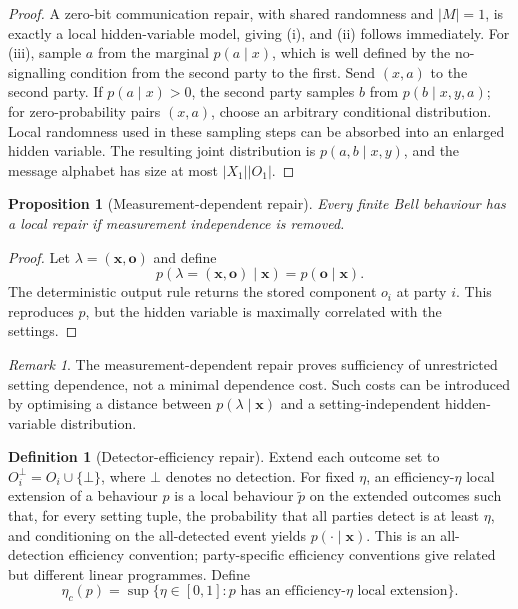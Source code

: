 \documentclass[11pt]{article}
\theoremstyle{plain}
\newtheorem{proposition}[theorem]{Proposition}
\theoremstyle{definition}
\newtheorem{definition}[theorem]{Definition}
\theoremstyle{remark}
\newtheorem{remark}[theorem]{Remark}
\begin{document}
\begin{proof}
A zero-bit communication repair, with shared randomness and \(|M|=1\), is
exactly a local hidden-variable model, giving (i), and (ii) follows immediately. For (iii), sample \(a\) from the marginal
\(p(a\mid x)\), which is well defined by the no-signalling condition from the
second party to the first. Send \((x,a)\) to the second party. If
\(p(a\mid x)>0\), the second party samples \(b\) from \(p(b\mid x,y,a)\); for
zero-probability pairs \((x,a)\), choose an arbitrary conditional distribution.
Local randomness used in these sampling steps can be absorbed into an enlarged
hidden variable. The resulting joint distribution is \(p(a,b\mid x,y)\), and the
message alphabet has size at most \(|X_1||O_1|\).
\end{proof}

\begin{proposition}[Measurement-dependent repair]
\label{prop:measurement-dependence-repair}
Every finite Bell behaviour has a local repair if measurement independence is
removed.
\end{proposition}

\begin{proof}
Let \(\lambda=(\mathbf x,
\mathbf o)\) and define
\[
p(\lambda=(\mathbf x,
\mathbf o)\mid\mathbf x)=p(\mathbf o\mid\mathbf x).
\]
The deterministic output rule returns the stored component \(o_i\) at party
\(i\). This reproduces \(p\), but the hidden variable is maximally correlated
with the settings.
\end{proof}

\begin{remark}
The measurement-dependent repair proves sufficiency of unrestricted setting
dependence, not a minimal dependence cost. Such costs can be introduced by
optimising a distance between \(p(\lambda\mid\mathbf x)\) and a
setting-independent hidden-variable distribution.
\end{remark}

\begin{definition}[Detector-efficiency repair]
\label{def:detection-repair}
Extend each outcome set to \(O_i^\bot=O_i\cup\{\bot\}\), where \(\bot\) denotes
no detection. For fixed \(\eta\), an efficiency-\(\eta\) local extension of a
behaviour \(p\) is a local behaviour \(\widetilde p\) on the extended outcomes
such that, for every setting tuple, the probability that all parties detect is
at least \(\eta\), and conditioning on the all-detected event yields
\(p(\cdot\mid\mathbf x)\). This is an all-detection efficiency convention;
party-specific efficiency conventions give related but different linear
programmes. Define
\[
\eta_c(p)=\sup\{\eta\in[0,1]:p\text{ has an efficiency-}\eta
\text{ local extension}\}.
\]
\end{definition}
\end{document}
